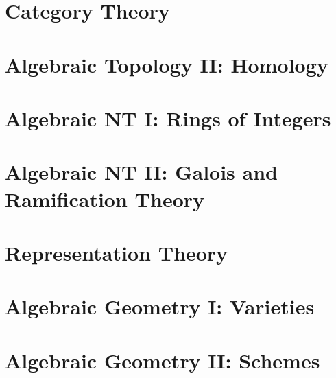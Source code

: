 \documentclass[11pt,numbers=noenddot]{scrreprt}
\begin{document}
\part{Category Theory}


\part{Algebraic Topology II: Homology}




\part{Algebraic NT I: Rings of Integers}





\part{Algebraic NT II: Galois and Ramification Theory}





\part{Representation Theory}





\part{Algebraic Geometry I: Varieties}

\part{Algebraic Geometry II: Schemes}
\end{document}
